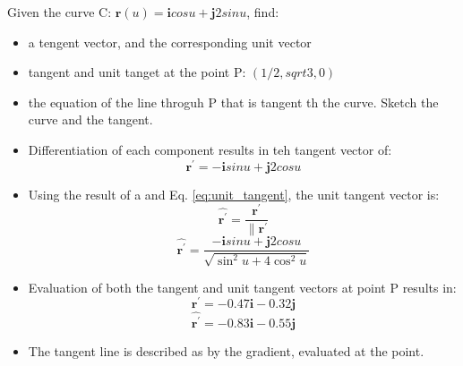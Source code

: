 Given the curve C: $\boldsymbol{r}\left(u\right)=\boldsymbol{i}cos u+\boldsymbol{j}2sin u$, find:
\begin{itemize}
	\item a tengent vector, and the corresponding unit vector
	\item tangent and unit tanget at the point P: $\left( 1/2 , sqrt{3},0\right)$
	\item the equation of the line throguh P that is tangent th the curve. Sketch the curve and the tangent.
\end{itemize}

\begin{itemize}
	\item Differentiation of each component results in teh tangent vector of:
	\begin{equation*}
		\boxed{
			\boldsymbol{r}^\prime= -\boldsymbol{i}sin u + \boldsymbol{j}2 cos u
		}
	\end{equation*}

	\item Using the result of a and Eq. \ref{eq:unit_tangent}, the unit tangent vector is:
		\begin{equation}
			\hat{\boldsymbol{r}^\prime}=\frac{\boldsymbol{r}^\prime}{\|\boldsymbol{r}^\prime}
			\label{eq:unit_tangent}
		\end{equation}
	\begin{equation*}
		\boxed{
			\hat{\boldsymbol{r}^\prime}= \frac{-\boldsymbol{i}sin u + \boldsymbol{j}2 cos u}{\sqrt{\sin^2u+4\cos^2u}}
		}
	\end{equation*}
\item Evaluation of both the tangent and unit tangent vectors at point P results in:
	\begin{equation*}
		\boxed{
			\boldsymbol{r}^\prime=-0.47\boldsymbol{i}-0.32\boldsymbol{j}
			}
		\end{equation*}
	\begin{equation*}
		\boxed{
			\hat{\boldsymbol{r}^\prime}=-0.83\boldsymbol{i}-0.55\boldsymbol{j}
			}
	\end{equation*}
\item The tangent line is described as by the gradient, evaluated at the point.
	
\end{itemize}
